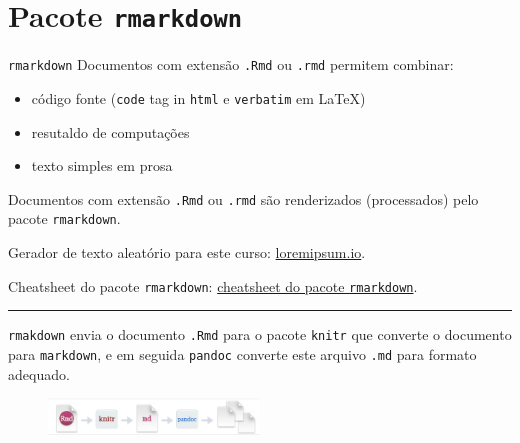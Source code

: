 \documentclass[
  10pt,
  ignorenonframetext,
]{beamer}
\providecommand{\tightlist}{%
  \setlength{\itemsep}{0pt}\setlength{\parskip}{0pt}}\usepackage{longtable,booktabs,array}
\newcommand*{\regrafina}{\rule{\textwidth}{0.5pt}}
\begin{document}
\hypertarget{pacote-rmarkdown}{%
\section{\texorpdfstring{Pacote
\texttt{rmarkdown}}{Pacote rmarkdown}}\label{pacote-rmarkdown}}

\begin{frame}[fragile]{\texttt{rmarkdown}}
\protect\hypertarget{rmarkdown}{}
Documentos com extensão \texttt{.Rmd} ou \texttt{.rmd} permitem
combinar:

\begin{itemize}
\tightlist
\item
  código fonte (\texttt{code} tag in \texttt{html} e \texttt{verbatim}
  em \LaTeX)
\item
  resutaldo de computações
\item
  texto simples em prosa
\end{itemize}

Documentos com extensão \texttt{.Rmd} ou \texttt{.rmd} são renderizados
(processados) pelo pacote \texttt{rmarkdown}.

Gerador de texto aleatório para este curso:
\href{https://loremipsum.io/}{loremipsum.io}.

Cheatsheet do pacote \texttt{rmarkdown}:
\href{https://posit.co/wp-content/uploads/2022/10/rmarkdown-1.pdf}{cheatsheet
do pacote \texttt{rmarkdown}}.

\regrafina

\texttt{rmakdown} envia o documento \texttt{.Rmd} para o pacote
\texttt{knitr} que converte o documento para \texttt{markdown}, e em
seguida \texttt{pandoc} converte este arquivo \texttt{.md} para formato
adequado.

\begin{figure}

{\centering \includegraphics[width=0.5\textwidth,height=\textheight]{figuras/rmarkdown-flow.png}

}

\end{figure}
\end{frame}
\end{document}
